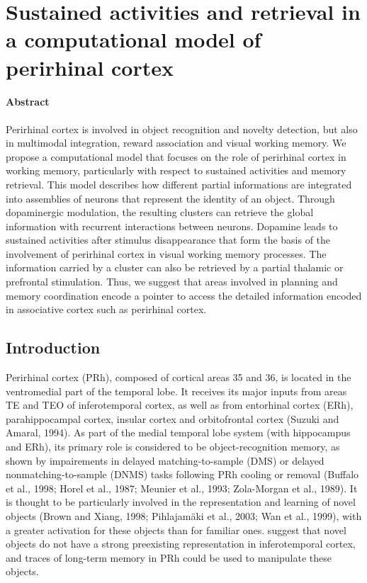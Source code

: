 \documentclass[
  11pt,
  a4paper,
]{scrbook}
\begin{document}

\chapter{Sustained activities and retrieval in a computational model of
perirhinal cortex}\label{sec-chapter:PRh}

\subsubsection*{Abstract}\label{abstract-1}

Perirhinal cortex is involved in object recognition and novelty
detection, but also in multimodal integration, reward association and
visual working memory. We propose a computational model that focuses on
the role of perirhinal cortex in working memory, particularly with
respect to sustained activities and memory retrieval. This model
describes how different partial informations are integrated into
assemblies of neurons that represent the identity of an object. Through
dopaminergic modulation, the resulting clusters can retrieve the global
information with recurrent interactions between neurons. Dopamine leads
to sustained activities after stimulus disappearance that form the basis
of the involvement of perirhinal cortex in visual working memory
processes. The information carried by a cluster can also be retrieved by
a partial thalamic or prefrontal stimulation. Thus, we suggest that
areas involved in planning and memory coordination encode a pointer to
access the detailed information encoded in associative cortex such as
perirhinal cortex.

\section{Introduction}\label{introduction}

Perirhinal cortex (PRh), composed of cortical areas 35 and 36, is
located in the ventromedial part of the temporal lobe. It receives its
major inputs from areas TE and TEO of inferotemporal cortex, as well as
from entorhinal cortex (ERh), parahippocampal cortex, insular cortex and
orbitofrontal cortex (Suzuki and Amaral, 1994). As part of the medial
temporal lobe system (with hippocampus and ERh), its primary role is
considered to be object-recognition memory, as shown by impairements in
delayed matching-to-sample (DMS) or delayed nonmatching-to-sample (DNMS)
tasks following PRh cooling or removal (Buffalo et al., 1998; Horel et
al., 1987; Meunier et al., 1993; Zola-Morgan et al., 1989). It is
thought to be particularly involved in the representation and learning
of novel objects (Brown and Xiang, 1998; Pihlajamäki et al., 2003; Wan
et al., 1999), with a greater activation for these objects than for
familiar ones. suggest that novel objects do not have a strong
preexisting representation in inferotemporal cortex, and traces of
long-term memory in PRh could be used to manipulate these objects.
\end{document}
